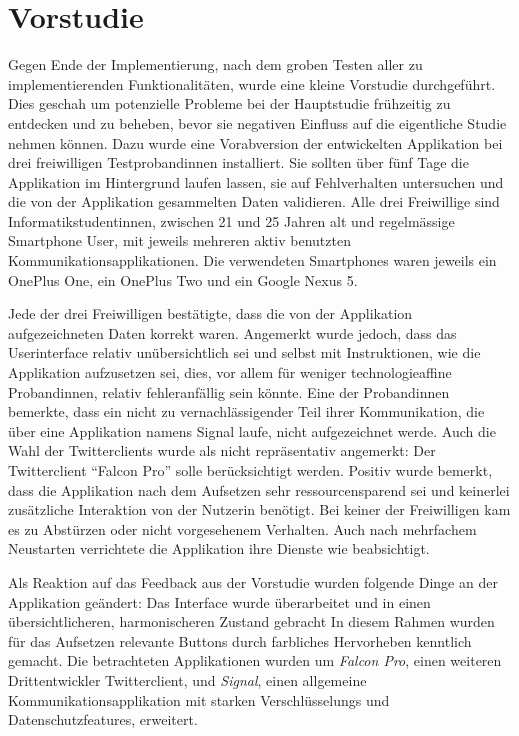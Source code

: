 \section{Vorstudie}

Gegen Ende der Implementierung, nach dem groben Testen aller zu implementierenden Funktionalitäten, wurde eine kleine Vorstudie durchgeführt.
Dies geschah um potenzielle Probleme bei der Hauptstudie frühzeitig zu entdecken und zu beheben, bevor sie negativen Einfluss auf die eigentliche Studie nehmen können.
Dazu wurde eine Vorabversion der entwickelten Applikation bei drei freiwilligen Testprobandinnen installiert.
Sie sollten über fünf Tage die Applikation im Hintergrund laufen lassen, sie auf Fehlverhalten untersuchen und die von der Applikation gesammelten Daten validieren.
Alle drei Freiwillige sind Informatikstudentinnen, zwischen 21 und 25 Jahren alt und regelmässige Smartphone User, mit jeweils mehreren aktiv benutzten Kommunikationsapplikationen.
Die verwendeten Smartphones waren jeweils ein OnePlus One, ein OnePlus Two und ein Google Nexus 5.
\par
Jede der drei Freiwilligen bestätigte, dass die von der Applikation aufgezeichneten Daten korrekt waren.
Angemerkt wurde jedoch, dass das Userinterface relativ unübersichtlich sei und selbst mit Instruktionen, wie die Applikation aufzusetzen sei, dies, vor allem für weniger technologieaffine Probandinnen, relativ fehleranfällig sein könnte.
Eine der Probandinnen bemerkte, dass ein nicht zu vernachlässigender Teil ihrer Kommunikation, die über eine Applikation namens Signal laufe, nicht aufgezeichnet werde.
Auch die Wahl der Twitterclients wurde als nicht repräsentativ angemerkt:
Der Twitterclient "`Falcon Pro"' solle berücksichtigt werden.
Positiv wurde bemerkt, dass die Applikation nach dem Aufsetzen sehr ressourcensparend sei und keinerlei zusätzliche Interaktion von der Nutzerin benötigt.
Bei keiner der Freiwilligen kam es zu Abstürzen oder nicht vorgesehenem Verhalten. Auch nach mehrfachem Neustarten verrichtete die Applikation ihre Dienste wie beabsichtigt.
\par
Als Reaktion auf das Feedback aus der Vorstudie wurden folgende Dinge an der Applikation geändert:
Das Interface wurde überarbeitet und in einen übersichtlicheren, harmonischeren Zustand gebracht
In diesem Rahmen wurden für das Aufsetzen relevante Buttons durch farbliches Hervorheben kenntlich gemacht.
Die betrachteten Applikationen wurden um \emph{Falcon Pro}, einen weiteren Drittentwickler Twitterclient, und \emph{Signal}, einen allgemeine Kommunikationsapplikation mit starken Verschlüsselungs und Datenschutzfeatures, erweitert.
